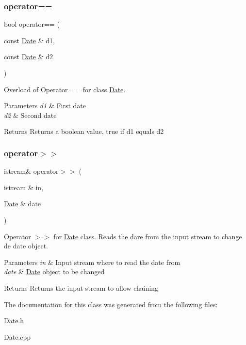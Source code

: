 \subsubsection{\texorpdfstring{operator==}{operator==}}
{\footnotesize\ttfamily bool operator== (\begin{DoxyParamCaption}\item[{const \hyperlink{class_date}{Date} \&}]{d1,  }\item[{const \hyperlink{class_date}{Date} \&}]{d2 }\end{DoxyParamCaption})\hspace{0.3cm}{\ttfamily [friend]}}

Overload of Operator == for class \hyperlink{class_date}{Date}. 
\begin{DoxyParams}{Parameters}
{\em d1} & First date \\
\hline
{\em d2} & Second date \\
\hline
\end{DoxyParams}
\begin{DoxyReturn}{Returns}
Returns a boolean value, true if d1 equals d2 
\end{DoxyReturn}
\hypertarget{class_date_a5b292605462c1f43c993c0b2f5592cdc}{}\label{class_date_a5b292605462c1f43c993c0b2f5592cdc} 
\subsubsection{\texorpdfstring{operator$>$$>$}{operator>>}}
{\footnotesize\ttfamily istream\& operator$>$$>$ (\begin{DoxyParamCaption}\item[{istream \&}]{in,  }\item[{\hyperlink{class_date}{Date} \&}]{date }\end{DoxyParamCaption})\hspace{0.3cm}{\ttfamily [friend]}}

Operator $>$$>$ for \hyperlink{class_date}{Date} class. Reads the dare from the input stream to change de date object. 
\begin{DoxyParams}{Parameters}
{\em in} & Input stream where to read the date from \\
\hline
{\em date} & \hyperlink{class_date}{Date} object to be changed \\
\hline
\end{DoxyParams}
\begin{DoxyReturn}{Returns}
Returns the input stream to allow chaining 
\end{DoxyReturn}


The documentation for this class was generated from the following files\+:\begin{DoxyCompactItemize}
\item 
Date.\+h\item 
Date.\+cpp\end{DoxyCompactItemize}
